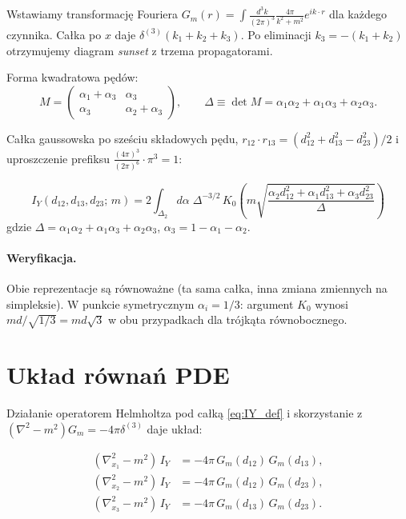 \documentclass[11pt,a4paper]{article}
\newcommand{\Dt}{\Delta}
\begin{document}
Wstawiamy transformacj\k{e} Fouriera $G_m(r)=\int\frac{d^3k}{(2\pi)^3}\frac{4\pi}{k^2+m^2}e^{ik\cdot r}$
dla ka\.{z}dego czynnika. Ca\l{}ka po $x$ daje $\delta^{(3)}(k_1+k_2+k_3)$.
Po eliminacji $k_3=-(k_1+k_2)$ otrzymujemy diagram \emph{sunset} z trzema propagatorami.

Forma kwadratowa p\k{e}d\'ow:
\begin{equation}
M = \begin{pmatrix}\alpha_1+\alpha_3 & \alpha_3\\ \alpha_3 & \alpha_2+\alpha_3\end{pmatrix},
\qquad \Dt\equiv\det M = \alpha_1\alpha_2+\alpha_1\alpha_3+\alpha_2\alpha_3.
\end{equation}

Ca\l{}ka gaussowska po sze\'sciu sk\l{}adowych p\k{e}du, $r_{12}\cdot r_{13}=(d_{12}^2+d_{13}^2-d_{23}^2)/2$
i uproszczenie prefiksu $\frac{(4\pi)^3}{(2\pi)^6}\cdot\pi^3=1$:

\begin{equation}
\label{eq:IY_feynman_2D}
\boxed{
I_Y(d_{12},d_{13},d_{23};\,m)
= 2\int_{\Delta_2} d\alpha\;
\Dt^{-3/2}\,
K_0\!\left(
m\sqrt{\frac{\alpha_2 d_{12}^2+\alpha_1 d_{13}^2+\alpha_3 d_{23}^2}{\Dt}}
\right)
}
\end{equation}
gdzie $\Dt=\alpha_1\alpha_2+\alpha_1\alpha_3+\alpha_2\alpha_3$, $\alpha_3=1-\alpha_1-\alpha_2$.

\paragraph{Weryfikacja.}
Obie reprezentacje s\k{a} r\'ownowa\.{z}ne (ta sama ca\l{}ka, inna zmiana zmiennych na simpleksie).
W punkcie symetrycznym $\alpha_i=1/3$: argument $K_0$ wynosi
$md/\sqrt{1/3}=md\sqrt3$ w obu przypadkach dla tr\'ojk\k{a}ta r\'ownobocznego.

\section{Uk\l{}ad r\'owna\'n PDE}
\label{sec:pde}

Dzia\l{}anie operatorem Helmholtza pod ca\l{}k\k{a} \eqref{eq:IY_def}
i skorzystanie z $(\nabla^2-m^2)G_m=-4\pi\delta^{(3)}$ daje uk\l{}ad:

\begin{align}
(\nabla_{x_1}^2-m^2)\,I_Y &= -4\pi\,G_m(d_{12})\,G_m(d_{13}), \label{eq:pde1}\\
(\nabla_{x_2}^2-m^2)\,I_Y &= -4\pi\,G_m(d_{12})\,G_m(d_{23}), \\
(\nabla_{x_3}^2-m^2)\,I_Y &= -4\pi\,G_m(d_{13})\,G_m(d_{23}). \label{eq:pde3}
\end{align}
\end{document}
